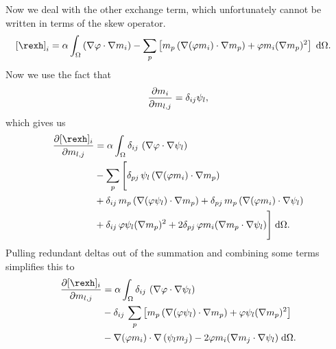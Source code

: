 Now we deal with the other exchange term, which unfortunately cannot be written in terms of the skew operator.
\begin{equation}
  \begin{aligned}
    \left[\rexh \right]_i &= \dampc \int_\magd
    \left(\nabla \tbf \cdot \nabla m_i \right)
    - \sum_p \left[ m_p
      \left(\nabla(\tbf m_i) \cdot \nabla m_p \right)
      + \tbf m_i (\nabla m_p)^2 \right] \d\magd.
  \end{aligned}
\end{equation}
Now we use the fact that
\begin{equation}
  \frac{\partial m_i}{\partial m_{l,j}} = \delta_{ij} \psi_l,
\end{equation}
which gives us
\begin{equation}
  \begin{aligned}
    \pd{[\rexh]_i}{m_{l,j}} &= \dampc \int_\magd
    \delta_{ij}\, \left(\nabla \tbf \cdot \nabla \sbf_l \right)
    \\
    &- \sum_p \Bigg[
       \delta_{pj}\, \sbf_l \left(\nabla(\tbf m_i) \cdot \nabla m_p \right)
       \\
       &+ \delta_{ij}\, m_p \left(\nabla(\tbf \sbf_l) \cdot \nabla m_p \right)
       + \delta_{pj}\, m_p \left(\nabla(\tbf m_i) \cdot \nabla \sbf_l \right)
       \\
       &+ \delta_{ij}\, \tbf \sbf_l (\nabla m_p)^2
       + 2 \delta_{pj}\, \tbf m_i (\nabla m_p \cdot \nabla \sbf_l)
      \Bigg]
    \d\magd.
  \end{aligned}
\end{equation}
Pulling redundant deltas out of the summation and combining some terms simplifies this to
\begin{equation}
  \begin{aligned}
    \pd{[\rexh]_i}{m_{l,j}} &= \dampc \int_\magd
    \delta_{ij}\, \left(\nabla \tbf \cdot \nabla \sbf_l \right)
    \\
    &- \delta_{ij}\, \sum_p \left[
      m_p \left(\nabla(\tbf \sbf_l) \cdot \nabla m_p \right)
      +\tbf \sbf_l (\nabla m_p)^2
      \right]
    \\
    &- \nabla(\tbf m_i) \cdot \nabla \left( \sbf_l m_j \right)
    - 2 \tbf m_i (\nabla m_j \cdot \nabla \sbf_l) \d\magd.
  \end{aligned}
\end{equation}





